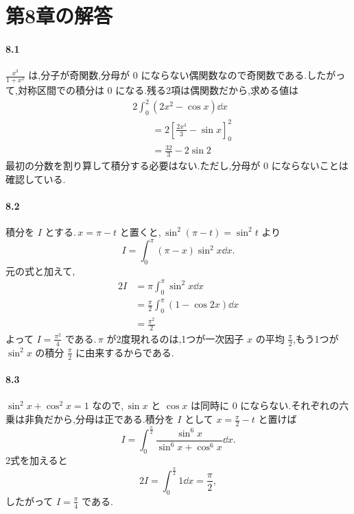 \section{第8章の解答}\label{解答:第8章}

\paragraph{8.1}
$\frac{x^3}{1+x^2}$ は,分子が奇関数,分母が $0$ にならない偶関数なので奇関数である.したがって,対称区間での積分は $0$ になる.残る2項は偶関数だから,求める値は
\[
\begin{aligned}
&2\int_0^2(2x^2-\cos x)\dd x\\
&\qquad=2\left[\frac{2x^3}{3}-\sin x\right]_0^2\\
&\qquad=\frac{32}{3}-2\sin2
\end{aligned}
\]
最初の分数を割り算して積分する必要はない.ただし,分母が $0$ にならないことは確認している.

\paragraph{8.2}
積分を $I$ とする.\,$x=\pi-t$ と置くと,\,$\sin^2(\pi-t)=\sin^2t$ より
\[
I=\int_0^\pi(\pi-x)\sin^2x\dd x.
\]
元の式と加えて,
\[
\begin{aligned}
2I&=\pi\int_0^\pi\sin^2x\dd x\\
 &=\frac{\pi}{2}\int_0^\pi(1-\cos2x)\dd x\\
 &=\frac{\pi^2}{2}
\end{aligned}
\]
よって $I=\frac{\pi^2}{4}$ である.\,$\pi$ が2度現れるのは,1つが一次因子 $x$ の平均 $\frac{\pi}{2}$,もう1つが $\sin^2x$ の積分 $\frac{\pi}{2}$ に由来するからである.

\paragraph{8.3}
$\sin^2x+\cos^2x=1$ なので,\,$\sin x$ と $\cos x$ は同時に $0$ にならない.それぞれの六乗は非負だから,分母は正である.積分を $I$ として $x=\frac{\pi}{2}-t$ と置けば
\[
I=\int_0^{\frac{\pi}{2}}
\frac{\sin^6x}{\sin^6x+\cos^6x}\dd x.
\]
2式を加えると
\[
2I=\int_0^{\frac{\pi}{2}}1\dd x=\frac{\pi}{2},
\]
したがって $I=\frac{\pi}{4}$ である.

